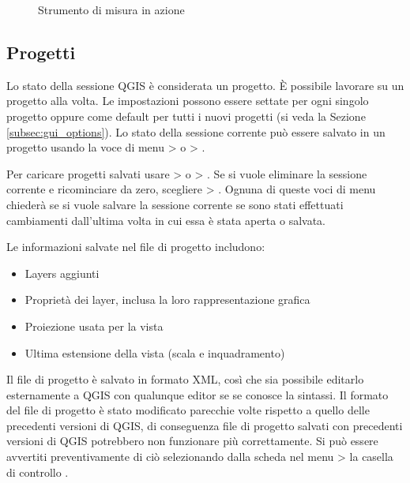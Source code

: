 \begin{figure}[h]
\caption{Strumento di misura in azione \nixcaption} \label{fig:measure}
\centering
   \goodgap
\end{figure}

\subsection{Progetti}\label{sec:projects}

Lo stato della sessione QGIS è considerata un progetto. 
È possibile lavorare su un progetto alla volta. Le impostazioni possono essere settate 
per ogni singolo progetto oppure come default per tutti i nuovi progetti (si veda la Sezione
\ref{subsec:gui_options}). Lo stato della sessione corrente può essere salvato
in un progetto usando la voce di menu  >
o  > .

Per caricare progetti salvati usare  >
o  > .
Se si vuole eliminare la sessione corrente e ricominciare da zero, scegliere
 > .
Ognuna di queste voci di menu chiederà se si vuole salvare la sessione
corrente se sono stati effettuati cambiamenti dall'ultima volta in cui essa è
stata aperta o salvata.

Le informazioni salvate nel file di progetto includono:

\begin{itemize}
\item Layers aggiunti
\item Proprietà dei layer, inclusa la loro rappresentazione grafica
\item Proiezione usata per la vista
\item Ultima estensione della vista (scala e inquadramento)
\end{itemize}

Il file di progetto è salvato in formato XML, così che sia possibile editarlo
esternamente a QGIS con qualunque editor se se conosce la sintassi. Il formato
del file di progetto è stato modificato parecchie volte rispetto a quello
delle precedenti versioni di QGIS, di conseguenza file di progetto salvati con
precedenti versioni di QGIS potrebbero non funzionare più correttamente. Si
può essere avvertiti preventivamente di ciò selezionando dalla scheda
 nel menu  >  
la casella di controllo .


